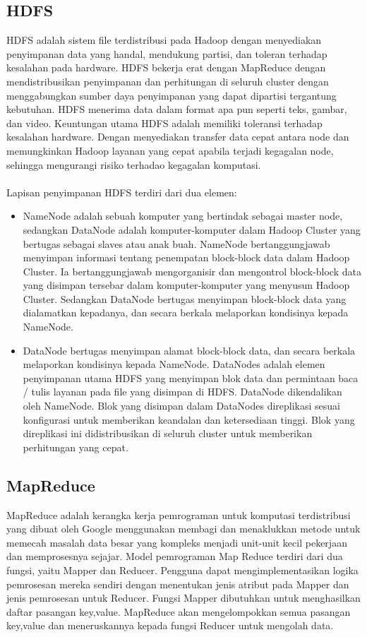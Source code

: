 \subsection{HDFS}
HDFS adalah sistem file terdistribusi pada Hadoop dengan menyediakan penyimpanan data yang handal, mendukung partisi, dan toleran terhadap kesalahan pada hardware. HDFS bekerja erat dengan MapReduce dengan mendistribusikan penyimpanan dan perhitungan di seluruh cluster dengan menggabungkan sumber daya penyimpanan yang dapat dipartisi tergantung kebutuhan. HDFS menerima data dalam format apa pun seperti teks, gambar, dan video. Keuntungan utama HDFS adalah memiliki toleransi terhadap kesalahan hardware. Dengan menyediakan transfer data cepat antara node dan memungkinkan Hadoop layanan yang cepat apabila terjadi kegagalan node, sehingga mengurangi risiko terhadao kegagalan komputasi. 
\\\\
Lapisan penyimpanan HDFS terdiri dari dua elemen:

\begin{itemize}
\item NameNode adalah sebuah komputer yang bertindak sebagai master node, sedangkan DataNode adalah komputer-komputer dalam Hadoop Cluster yang bertugas sebagai slaves atau anak buah. NameNode bertanggungjawab menyimpan informasi tentang penempatan block-block data dalam Hadoop Cluster. Ia bertanggungjawab mengorganisir dan mengontrol block-block data yang disimpan tersebar dalam komputer-komputer yang menyusun Hadoop Cluster. Sedangkan DataNode bertugas menyimpan block-block data yang dialamatkan kepadanya, dan secara berkala melaporkan kondisinya kepada NameNode.
\item DataNode bertugas menyimpan alamat block-block data, dan secara berkala melaporkan kondisinya kepada NameNode. DataNodes adalah elemen penyimpanan utama HDFS yang menyimpan blok data dan permintaan baca / tulis layanan pada file yang disimpan di HDFS. DataNode dikendalikan oleh NameNode. Blok yang disimpan dalam DataNodes direplikasi sesuai konfigurasi untuk memberikan keandalan dan ketersediaan tinggi. Blok yang direplikasi ini didistribusikan di seluruh cluster untuk memberikan perhitungan yang cepat.
\end{itemize}

\subsection{MapReduce}
MapReduce adalah kerangka kerja pemrograman untuk komputasi terdistribusi yang dibuat oleh Google menggunakan membagi dan menaklukkan metode untuk memecah masalah data besar yang kompleks menjadi unit-unit kecil pekerjaan dan memprosesnya
sejajar. Model pemrograman Map Reduce terdiri dari dua fungsi, yaitu Mapper dan Reducer. Pengguna dapat mengimplementasikan logika pemrosesan mereka sendiri dengan menentukan jenis atribut pada Mapper dan jenis pemrosesan untuk Reducer. Fungsi Mapper dibutuhkan
untuk menghasilkan daftar pasangan key,value. MapReduce akan mengelompokkan semua pasangan key,value dan meneruskannya kepada fungsi Reducer untuk mengolah data.

